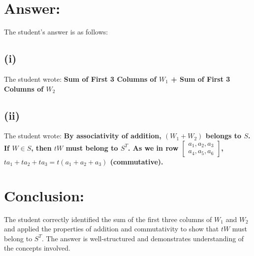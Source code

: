 \documentclass[12pt]{article}
\begin{document}
\section*{Answer:}
The student's answer is as follows:

\subsection*{(i)}
The student wrote:
\textbf{Sum of First 3 Columns of $W_{1}$ + Sum of First 3 Columns of $W_{2}$}

\subsection*{(ii)}
The student wrote:
\textbf{By associativity of addition, $(W_{1}+W_{2})$ belongs to $S$. If $W \in S$, then $tW$ must belong to $S^{T}$. As we in row $\left[\begin{array}{ccc}a_{1}, a_{2}, a_{3}\\a_{4}, a_{5}, a_{6}\end{array}\right]$, $ta_{1}+ta_{2}+ta_{3}=t(a_{1}+a_{2}+a_{3})$ (commutative).}

\section*{Conclusion:}
The student correctly identified the sum of the first three columns of $W_{1}$ and $W_{2}$ and applied the properties of addition and commutativity to show that $tW$ must belong to $S^{T}$. The answer is well-structured and demonstrates understanding of the concepts involved.
\end{document}
